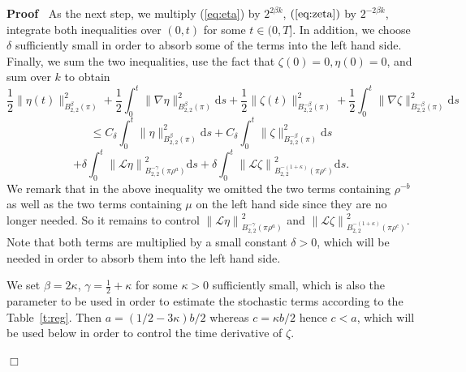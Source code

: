 \documentclass[a4paper,11pt]{article}
\newcommand{\mathd}{\mathrm{d}}
\newenvironment{proof}{\noindent\textbf{Proof\ }}{\hspace*{\fill}$\Box$\medskip}
\numberwithin{equation}{section}
\newcommand{\LL}{\mathscr{L}}
\newcommand{\8}{\infty}
\begin{document}
\begin{proof}
  As the next step, we multiply (\ref{eq:eta}) by $2^{2 \beta k}$,
  $(\ref{eq:zeta})$ by $2^{- 2 \beta k}$, integrate both inequalities over
  $(0, t)$ for some $t \in (0, T]$. In addition, we choose $\delta$
  sufficiently small  in order to absorb some of the
  terms into the left hand side. Finally, we sum the two inequalities, use the
  fact that $\zeta (0) = 0, \eta (0) = 0$, and sum over $k$ to obtain
  \[ \frac{1}{2} \| \eta (t) \|_{B^{\beta}_{2, 2} (\pi)}^2 + \frac{1}{2}\int_0^t \|
     \nabla \eta \|_{B^{\beta}_{2, 2} (\pi)}^2 \mathd s + \frac{1}{2} \| \zeta
     (t) \|_{B^{- \beta}_{2, 2} (\pi)}^2 + \frac{1}{2}\int_0^t \| \nabla \zeta \|_{B^{-
     \beta}_{2, 2} (\pi)}^2 \mathd s \]
  \begin{equation}\label{eq:s1}
    \le C_{\delta} \int_{0}^{t}\| \eta \|^2_{B^{\beta}_{2,2}
     (\pi)}\mathd s +C_{\delta} \int_{0}^{t}\| \zeta \|^2_{B^{-\beta}_{2,2}
     (\pi)}\mathd s 
     \end{equation}
     \begin{equation}+ \delta \int_0^t \left\| \LL \eta \right\|^2_{B^{- \gamma}_{2, 2}
    (\pi \rho^a)} \mathd s + \delta \int_0^t \left\| \LL \zeta \right\|^2_{B^{-
    (1 + \kappa)}_{2, 2} (\pi \rho^c)} \mathd s. \label{eq:s}
  \end{equation}
  We remark that in the above inequality we omitted the two terms containing $\rho^{-b}$ as well as the two terms containing $\mu$ on the left hand side since they are no longer needed.
  So it remains to control $\left\| \LL \eta \right\|^2_{B^{- \gamma}_{2, 2}
  (\pi \rho^a)}$ and $\left\| \LL \zeta \right\|^2_{B^{- (1 + \kappa)}_{2, 2}
  (\pi \rho^c)}$. Note that both terms are multiplied by a small constant
  $\delta > 0$, which will be needed in order to absorb them into the left hand side.
  
 We set $\beta = 2 \kappa$, $\gamma = \frac 12 +\kappa$ for some $\kappa > 0$
  sufficiently small, which is also the parameter to be used in order to
  estimate the stochastic terms according to the Table~\ref{t:reg}. Then $a=(1/2-3\kappa)b/2$ whereas $c=\kappa b/2$
hence  $c<a$, which will be used below in order to control the time derivative of $\zeta$.
  

\end{proof}
\end{document}
